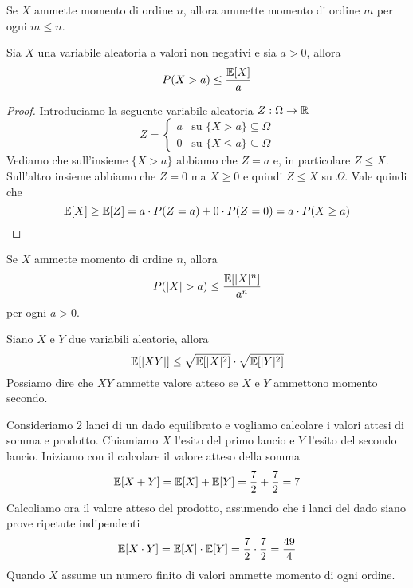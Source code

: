 \begin{proposition}
	Se $X$ ammette momento di ordine $n$, allora ammette momento di ordine $m$ per ogni $m \leq n$.
\end{proposition}

\begin{proposition}
	Sia $X$ una variabile aleatoria a valori non negativi e sia $a>0$, allora
	\[ P(X > a) \leq \frac{\mathbb{E}[X]}{a} \]
	\begin{proof}
		Introduciamo la seguente variabile aleatoria $Z : \Omega \to \mathbb{R}$
		\[
			Z = \begin{cases}
				a & \text{su } \{ X > a \} \subseteq \Omega    \\
				0 & \text{su } \{ X \leq a \} \subseteq \Omega
			\end{cases}
		\]
		Vediamo che sull'insieme $\{ X > a \}$ abbiamo che $Z = a$ e, in particolare $Z \leq X$.
		Sull'altro insieme abbiamo che $Z = 0$ ma $X \geq 0$ e quindi $Z \leq X$ su $\Omega$.
		Vale quindi che
		\[ \mathbb{E}[X] \geq \mathbb{E}[Z] = a \cdot P(Z = a) + 0 \cdot P(Z = 0) = a \cdot P(X \geq a) \]
	\end{proof}
\end{proposition}

\begin{corollary}
	Se $X$ ammette momento di ordine $n$, allora
	\[ P(|X| > a) \leq \frac{\mathbb{E}[|X|^n]}{a^n} \]
	per ogni $a > 0$.
\end{corollary}

\begin{proposition}
	Siano $X$ e $Y$ due variabili aleatorie, allora
	\[ \mathbb{E}[|XY|] \leq \sqrt{\mathbb{E}[|X|^2]} \cdot \sqrt{\mathbb{E}[|Y|^2]} \]
	Possiamo dire che $XY$ ammette valore atteso se $X$ e $Y$ ammettono momento secondo.
\end{proposition}

\begin{example}
	Consideriamo 2 lanci di un dado equilibrato e vogliamo calcolare i valori attesi di somma e
	prodotto. Chiamiamo $X$ l'esito del primo lancio e $Y$ l'esito del secondo lancio. Iniziamo
	con il calcolare il valore atteso della somma
	\[ \mathbb{E}[X + Y] = \mathbb{E}[X] + \mathbb{E}[Y] = \frac{7}{2} + \frac{7}{2} = 7 \]
	Calcoliamo ora il valore atteso del prodotto, assumendo che i lanci del dado siano prove
	ripetute indipendenti
	\[ \mathbb{E}[X \cdot Y] = \mathbb{E}[X] \cdot \mathbb{E}[Y] = \frac{7}{2} \cdot \frac{7}{2} = \frac{49}{4} \]
	Quando $X$ assume un numero finito di valori ammette momento di ogni ordine.
\end{example}

